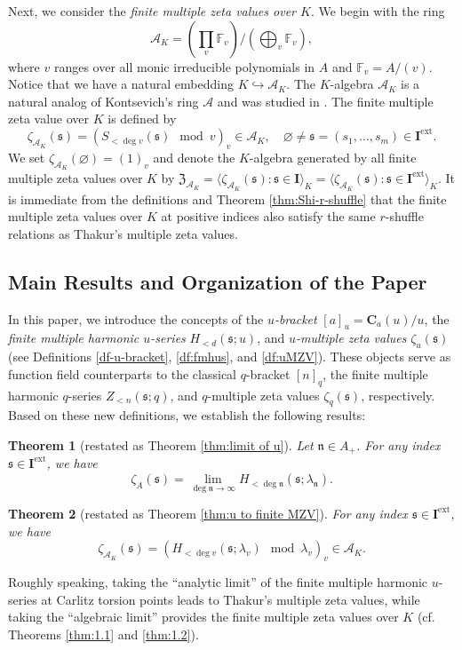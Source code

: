 \documentclass[12pt,reqno]{amsart}
\numberwithin{equation}{section}
\theoremstyle{plain}
\newtheorem{thm}{Theorem}[section]
\theoremstyle{definition}
\theoremstyle{remark}
\newcommand{\FF}{\mathbb{F}}
\newcommand{\nfk}{\mathfrak{n}}
\newcommand{\Acal}{\mathcal{A}}
\newcommand{\ww}[1]{\mathfrak{#1}}
\newcommand{\C}{\mathbf{C}}
\newcommand{\Ical}{\mathbf{I}}
\newcommand{\Zcal}{\mathfrak{Z}}
\newcommand{\ext}{\mathrm{ext}}
\begin{document}
Next, we consider the \textit{finite multiple zeta values over $K$}. We begin with the ring
\[
\Acal_K=\left(\prod_{v}\FF_v\right)\Bigg/\left(\bigoplus_v \FF_v\right),
\]
where $v$ ranges over all monic irreducible polynomials in $A$ and $\FF_v=A/(v)$. Notice that we have a natural embedding $K \hookrightarrow \Acal_K$. The $K$-algebra $\Acal_K$ is a natural analog of Kontsevich's ring $\Acal$ and was studied in \cite{CM17,Shi2018}. The finite multiple zeta value over $K$ is defined by
\[
\zeta_{\Acal_K}(\ww{s})=\left(S_{<\deg v}(\ww{s})\mod{v}\right)_v\in\Acal_K,\quad \varnothing\neq \ww{s}=(s_1,\ldots,s_m)\in\Ical^{\ext}.
\]
We set $\zeta_{\Acal_K}(\varnothing)=(1)_v$ and denote the $K$-algebra generated by all finite multiple zeta values over $K$ by $\Zcal_{\Acal_K}=\langle \zeta_{\Acal_K}(\ww{s}):\ww{s}\in\Ical\rangle_K=\langle \zeta_{\Acal_K}(\ww{s}):\ww{s}\in\Ical^{\ext}\rangle_K$. It is immediate from the definitions and Theorem \ref{thm:Shi-r-shuffle} that the finite multiple zeta values over $K$ at positive indices also satisfy the same $r$-shuffle relations as Thakur's multiple zeta values. 
\subsection{Main Results and Organization of the Paper}
In this paper, we introduce the concepts of the \textit{$u$-bracket} $[a]_u=\C_a(u)/u$, the \textit{finite multiple harmonic $u$-series} $H_{<d}(\ww{s};u)$, and \textit{$u$-multiple zeta values} $\zeta_u(\ww{s})$ (see Definitions \ref{df-u-bracket}, \ref{df:fmhus}, and \ref{df:uMZV}). These objects serve as function field counterparts to the classical $q$-bracket $[n]_q$, the finite multiple harmonic $q$-series $Z_{<n}(\ww{s};q)$, and $q$-multiple zeta values $\zeta_q(\ww{s})$, respectively. Based on these new definitions, we establish the following results:
\begin{thm}[restated as Theorem \ref{thm:limit of u}]\label{thm:main1}
    Let $\nfk\in A_+$. For any index $\ww{s}\in\Ical^{\ext}$, we have $$\zeta_A(\ww{s})=\lim_{\deg\nfk\to\infty}H_{<\deg\nfk}(\ww{s};\lambda_\nfk).$$
\end{thm}

\begin{thm}[restated as Theorem \ref{thm:u to finite MZV}]\label{thm:main2}
    For any index $\ww{s}\in\Ical^{\ext}$, we have
    $$
        \zeta_{\mathcal{A}_K}(\ww{s})=\left(H_{<\deg v}(\ww{s};\lambda_v)\mod{\lambda_v}\right)_v\in\mathcal{A}_K.
    $$
\end{thm}
Roughly speaking, taking the ``analytic limit'' of the finite multiple harmonic $u$-series at Carlitz torsion points leads to Thakur's multiple zeta values, while taking the ``algebraic limit'' provides the finite multiple zeta values over $K$ (cf. Theorems \ref{thm:1.1} and \ref{thm:1.2}). 
\end{document}
